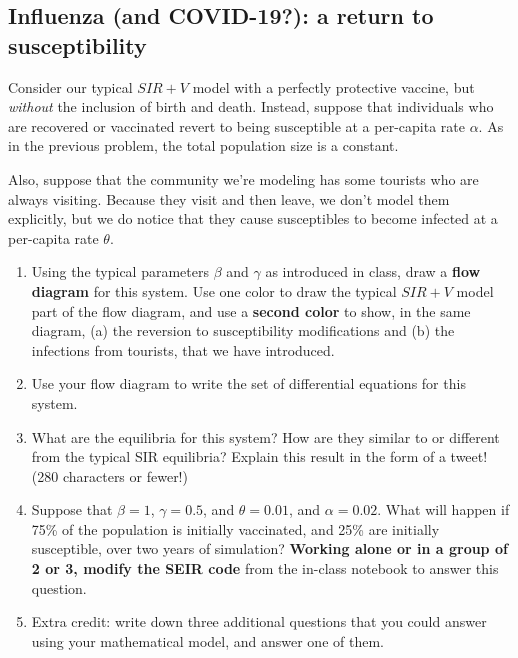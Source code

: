 \documentclass[11pt,onecolumn,superscriptaddress,notitlepage]{article}
\begin{document}
\clearpage
\subsection*{Influenza (and COVID-19?): a return to susceptibility}

Consider our typical $SIR+V$ model with a perfectly protective vaccine, but {\it without} the inclusion of birth and death. Instead, suppose that individuals who are recovered or vaccinated revert to being susceptible at a per-capita rate $\alpha$. As in the previous problem, the total population size is a constant. 

Also, suppose that the community we're modeling has some tourists who are always visiting. Because they visit and then leave, we don't model them explicitly, but we do notice that they cause susceptibles to become infected at a per-capita rate $\theta$. 

\begin{enumerate}[resume]
	\item Using the typical parameters $\beta$ and $\gamma$ as introduced in class, draw a {\bf flow diagram} for this system. Use one color to draw the typical $SIR+V$ model part of the flow diagram, and use a {\bf second color} to show, in the same diagram, (a) the reversion to susceptibility modifications and (b) the infections from tourists, that we have introduced.
	\item Use your flow diagram to write the set of differential equations for this system.
	\item What are the equilibria for this system? How are they similar to or different from the typical SIR equilibria? Explain this result in the form of a tweet! (280 characters or fewer!)
	\item Suppose that $\beta=1$, $\gamma=0.5$, and $\theta=0.01$, and $\alpha=0.02$. What will happen if 75\% of the population is initially vaccinated, and 25\% are initially susceptible, over two years of simulation? {\bf Working alone or in a group of 2 or 3, modify the SEIR code} from the in-class notebook to answer this question.
	\item Extra credit: write down three additional questions that you could answer using your mathematical model, and answer one of them.
\end{enumerate}

\end{document}
